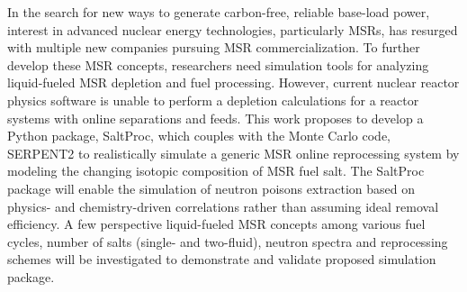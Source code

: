 In the search for new ways to generate carbon-free, reliable 
base-load power, interest in advanced nuclear energy technologies, 
particularly \glspl{MSR}, has resurged with multiple new companies 
pursuing \gls{MSR} commercialization. To further develop these \gls{MSR} 
concepts, researchers need simulation tools for analyzing liquid-fueled 
\gls{MSR} depletion and fuel processing. However, current nuclear reactor 
physics software is unable to perform a depletion calculations for a 
reactor systems with online separations and feeds. This work proposes to 
develop a Python package, SaltProc, which couples 
with the Monte Carlo code, SERPENT2 to realistically simulate a generic 
\gls{MSR} online reprocessing system by modeling the changing isotopic 
composition of \gls{MSR} fuel salt. The SaltProc package will enable 
the simulation of neutron poisons extraction based on physics- and 
chemistry-driven correlations rather than assuming ideal 
removal efficiency. A few perspective liquid-fueled 
\gls{MSR} concepts among various fuel cycles, number of salts
(single- and two-fluid), neutron spectra and reprocessing schemes 
will be investigated to demonstrate and validate proposed simulation 
package.